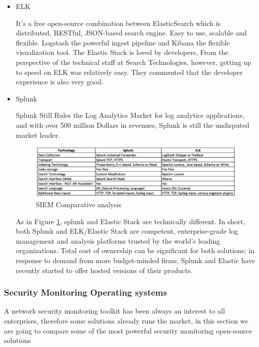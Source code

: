 \begin{itemize}
    \item ELK 
    
    It's a free open-source combination between ElasticSearch which is distributed, RESTful, JSON-based search engine. Easy to use, scalable and flexible. Logstash the powerful ingest pipeline and Kibana the flexible visualization tool. The Elastic Stack is loved by developers, From the perspective of the technical staff at Search Technologies, however, getting up to speed on ELK was relatively easy. They commented that the developer experience is also very good.
    \item Splunk
    
    Splunk Still Rules the Log Analytics Market for log analytics applications, and with over 500 million Dollars in revenues, Splunk is still the undisputed market leader. 
\begin{figure}[!htpb] 
\begin{center}
\includegraphics[width=18cm]{images/ATHENAsiemcompare.png}
\end{center}
\caption{ SIEM Comparative analysis }
\label{siemcomp}
\end{figure}

As in Figure \ref{siemcomp}, splunk and Elastic Stack are technically different.
In short, both Splunk and ELK/Elastic Stack are competent, enterprise-grade log management and analysis platforms trusted by the world's leading organizations. Total cost of ownership can be significant for both solutions; in response to demand from more budget-minded firms, Splunk and Elastic have recently started to offer hosted versions of their products. 

\end{itemize}
\subsubsection{ Security Monitoring Operating systems}

A network security monitoring toolkit has been always an interest to all enterprises, therefore some solutions already runs the market, in this section we are going to compare some of the most powerful security monitoring open-source solutions 

